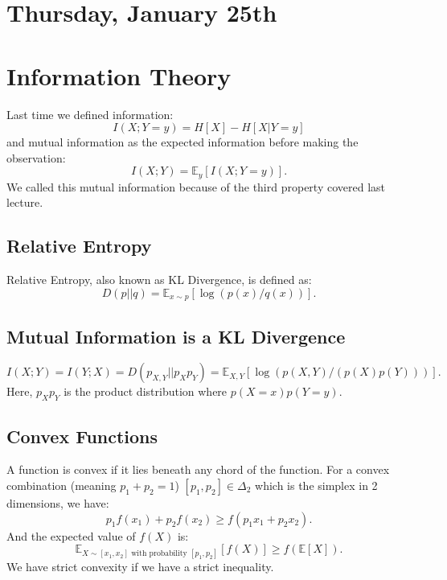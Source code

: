\section{Thursday, January 25th}
\section*{Information Theory}

Last time we defined information:
\begin{equation*}
I(X; Y=y) = H[X] - H[X | Y=y]
\end{equation*}
and mutual information as the expected information before making the observation:
\begin{equation*}
I(X; Y) = \mathbb{E}_y[I(X; Y=y)].
\end{equation*}
We called this mutual information because of the third property covered last lecture.

\subsection{Relative Entropy}
Relative Entropy, also known as KL Divergence, is defined as:
\begin{equation*}
D(p || q) = \mathbb{E}_{x \sim p}[\log(p(x)/q(x))].
\end{equation*}

\subsection{Mutual Information is a KL Divergence}
\begin{equation*}
I(X; Y) = I(Y; X) = D(p_{X, Y} || p_X p_Y) = \mathbb{E}_{X, Y}[\log(p(X, Y)/(p(X)p(Y)))].
\end{equation*}
Here, \( p_X p_Y \) is the product distribution where \( p(X=x) p(Y=y) \).

\subsection{Convex Functions}
A function is convex if it lies beneath any chord of the function. For a convex combination (meaning \( p_1 + p_2 = 1 \)) \([p_1, p_2] \in \Delta_2\) which is the simplex in 2 dimensions, we have:
\begin{equation*}
p_1 f(x_1) + p_2 f(x_2) \geq f(p_1 x_1 + p_2 x_2).
\end{equation*}
And the expected value of \( f(X) \) is:
\begin{equation*}
\mathbb{E}_{X \sim [x_1, x_2] \text{ with probability } [p_1, p_2]}[f(X)] \geq f(\mathbb{E}[X]).
\end{equation*}
We have strict convexity if we have a strict inequality.

